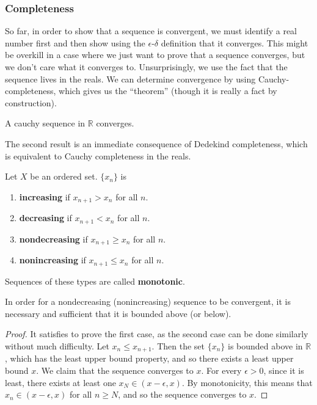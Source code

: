  \subsubsection{Completeness} 

    So far, in order to show that a sequence is convergent, we must identify a real number first and then show using the $\epsilon$-$\delta$ definition that it converges. This might be overkill in a case where we just want to prove that a sequence converges, but we don't care what it converges to. Unsurprisingly, we use the fact that the sequence lives in the reals. We can determine convergence by using Cauchy-completeness, which gives us the ``theorem'' (though it is really a fact by construction). 

    \begin{theorem}
      A cauchy sequence in $\mathbb{R}$ converges. 
    \end{theorem} 

    The second result is an immediate consequence of Dedekind completeness, which is equivalent to Cauchy completeness in the reals.  

    \begin{definition}
      Let $X$ be an ordered set. $\{x_n\}$ is 
      \begin{enumerate}
        \item \textbf{increasing} if $x_{n+1} > x_n$ for all $n$.
        \item \textbf{decreasing} if $x_{n+1} < x_n$ for all $n$.
        \item \textbf{nondecreasing} if $x_{n+1} \geq x_n$ for all $n$.
        \item \textbf{nonincreasing} if $x_{n+1} \leq x_n$ for all $n$.
      \end{enumerate}
      Sequences of these types are called \textbf{monotonic}. 
    \end{definition}

    \begin{lemma}
      In order for a nondecreasing (nonincreasing) sequence to be convergent, it is necessary and sufficient that it is bounded above (or below). 
    \end{lemma}
    \begin{proof}
      It satisfies to prove the first case, as the second case can be done similarly without much difficulty. Let $x_n \leq x_{n+1}$. Then the set $\{x_n\}$ is bounded above in $\mathbb{R}$, which has the least upper bound property, and so there exists a least upper bound $x$. We claim that the sequence converges to $x$. For every $\epsilon > 0$, since it is least, there exists at least one $x_N \in (x - \epsilon, x)$. By monotonicity, this means that $x_n \in (x - \epsilon, x)$ for all $n \geq N$, and so the sequence converges to $x$. 
    \end{proof}

